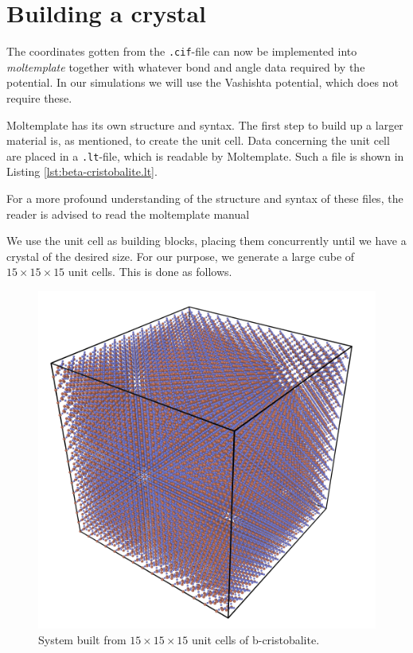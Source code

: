 \documentclass[twoside,english]{uiofysmaster}
\begin{document}
\section{Building a crystal}
The coordinates gotten from the \texttt{.cif}-file can now be implemented into \textit{moltemplate} together with whatever bond and angle data required by the potential. In our simulations we will use the Vashishta potential, which does not require these. 

Moltemplate has its own structure and syntax. The first step to build up a larger material is, as mentioned, to create the unit cell. Data concerning the unit cell are placed in a \texttt{.lt}-file, which is readable by Moltemplate. Such a file is shown in Listing \ref{lst:beta-cristobalite.lt}. 

For a more profound understanding of the structure and syntax of these files, the reader is advised to read the moltemplate manual  

\begin{center}
\begin{minipage}{\linewidth}
	
\end{minipage}
\end{center}

We use the unit cell as building blocks, placing them concurrently until we have a crystal of the desired size. For our purpose, we generate a large cube of $15\times15\times15$ unit cells. This is done as follows.



\begin{figure}
	\centering
	\includegraphics[width=0.7\linewidth]{figures/CreatingSystem/hugeCube}
	\caption{System built from $15\times15\times15$ unit cells of b-cristobalite.}
	\label{fig:hugeCube}
\end{figure}
\end{document}
